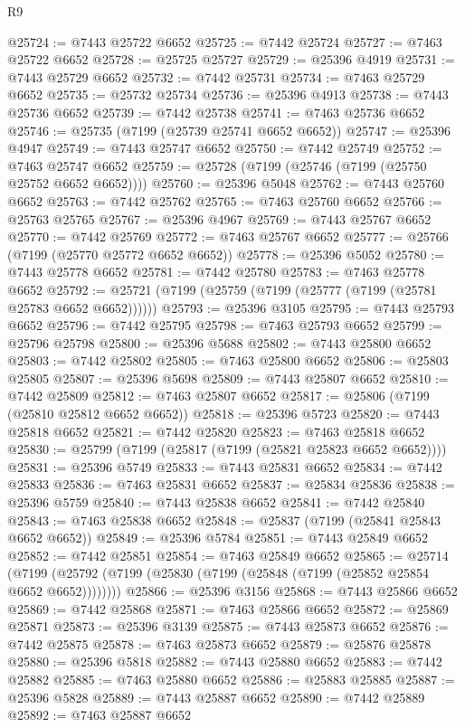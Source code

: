 \begin{lexlean}{R9}
\begin{coremodule}
@25724 := @7443 @25722 @6652
@25725 := @7442 @25724
@25727 := @7463 @25722 @6652
@25728 := @25725 @25727
@25729 := @25396 @4919
@25731 := @7443 @25729 @6652
@25732 := @7442 @25731
@25734 := @7463 @25729 @6652
@25735 := @25732 @25734
@25736 := @25396 @4913
@25738 := @7443 @25736 @6652
@25739 := @7442 @25738
@25741 := @7463 @25736 @6652
@25746 := @25735 (@7199 (@25739 @25741 @6652 @6652))
@25747 := @25396 @4947
@25749 := @7443 @25747 @6652
@25750 := @7442 @25749
@25752 := @7463 @25747 @6652
@25759 := @25728 (@7199 (@25746 (@7199 (@25750 @25752 @6652 @6652))))
@25760 := @25396 @5048
@25762 := @7443 @25760 @6652
@25763 := @7442 @25762
@25765 := @7463 @25760 @6652
@25766 := @25763 @25765
@25767 := @25396 @4967
@25769 := @7443 @25767 @6652
@25770 := @7442 @25769
@25772 := @7463 @25767 @6652
@25777 := @25766 (@7199 (@25770 @25772 @6652 @6652))
@25778 := @25396 @5052
@25780 := @7443 @25778 @6652
@25781 := @7442 @25780
@25783 := @7463 @25778 @6652
@25792 := @25721 (@7199 (@25759 (@7199 (@25777 (@7199 (@25781 @25783 @6652 @6652))))))
@25793 := @25396 @3105
@25795 := @7443 @25793 @6652
@25796 := @7442 @25795
@25798 := @7463 @25793 @6652
@25799 := @25796 @25798
@25800 := @25396 @5688
@25802 := @7443 @25800 @6652
@25803 := @7442 @25802
@25805 := @7463 @25800 @6652
@25806 := @25803 @25805
@25807 := @25396 @5698
@25809 := @7443 @25807 @6652
@25810 := @7442 @25809
@25812 := @7463 @25807 @6652
@25817 := @25806 (@7199 (@25810 @25812 @6652 @6652))
@25818 := @25396 @5723
@25820 := @7443 @25818 @6652
@25821 := @7442 @25820
@25823 := @7463 @25818 @6652
@25830 := @25799 (@7199 (@25817 (@7199 (@25821 @25823 @6652 @6652))))
@25831 := @25396 @5749
@25833 := @7443 @25831 @6652
@25834 := @7442 @25833
@25836 := @7463 @25831 @6652
@25837 := @25834 @25836
@25838 := @25396 @5759
@25840 := @7443 @25838 @6652
@25841 := @7442 @25840
@25843 := @7463 @25838 @6652
@25848 := @25837 (@7199 (@25841 @25843 @6652 @6652))
@25849 := @25396 @5784
@25851 := @7443 @25849 @6652
@25852 := @7442 @25851
@25854 := @7463 @25849 @6652
@25865 := @25714
    (@7199 (@25792 (@7199 (@25830 (@7199 (@25848 (@7199 (@25852 @25854 @6652 @6652))))))))
@25866 := @25396 @3156
@25868 := @7443 @25866 @6652
@25869 := @7442 @25868
@25871 := @7463 @25866 @6652
@25872 := @25869 @25871
@25873 := @25396 @3139
@25875 := @7443 @25873 @6652
@25876 := @7442 @25875
@25878 := @7463 @25873 @6652
@25879 := @25876 @25878
@25880 := @25396 @5818
@25882 := @7443 @25880 @6652
@25883 := @7442 @25882
@25885 := @7463 @25880 @6652
@25886 := @25883 @25885
@25887 := @25396 @5828
@25889 := @7443 @25887 @6652
@25890 := @7442 @25889
@25892 := @7463 @25887 @6652

\end{coremodule}
\end{lexlean}
